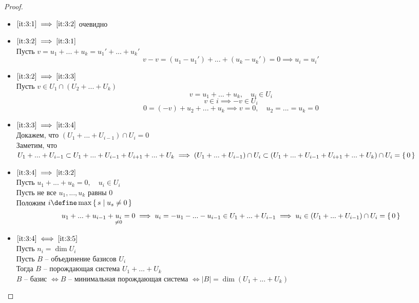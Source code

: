\begin{proof}
    \hfill
    \begin{itemize}
        \item $ \ref{it:3:1} \implies \ref{it:3:2} $ очевидно
        \item $ \ref{it:3:2} \implies \ref{it:3:1} $ \\
        Пусть $ v = u_1 + ... + u_k = u_1' + ... + u_k' $
        $$ v - v = (u_1 - u_1') + ... + (u_k - u_k') = 0 \implies u_i = u_i' $$
        \item $ \ref{it:3:2} \implies \ref{it:3:3} $ \\
        Пусть $v \in U_1 \cap (U_2 + ... + U_k) $
        $$ v = u_1 + ... + u_k, \quad u_i \in U_i $$
        $$ v \in i \implies -v \in U_i $$
        $$ 0 = (-v) + u_2 + ... + u_k \implies v = 0, \quad u_2 = ... = u_k = 0 $$
        \item $ \ref{it:3:3} \implies \ref{it:3:4} $ \\
        Докажем, что $ (U_1 + ... + U_{i - 1}) \cap U_i = 0 $ \\
        Заметим, что $ U_1 + ... + U_{i - 1} \subset U_1 + ... + U_{i - 1} + U_{i + 1} + ... + U_k \implies (U_1 + ... + U_{i - 1}) \cap U_i \subset (U_1 + ... + U_{i - 1} + U_{i + 1} + ... + U_k) \cap U_i = \set{0} $
        \item $ \ref{it:3:4} \implies \ref{it:3:2} $ \\
        Пусть $ u_1 + ... + u_k = 0, \quad u_i \in U_i $ \\
        Пусть не все $ u_1, ..., u_k $ равны 0 \\
        Положим $ i \define \max\set{s | u_s \ne 0} $
        $$ u_1 + ... + u_{i - 1} + \underset{\ne 0}{u_i} = 0 \implies u_i = -u_1 - ... - u_{i - 1} \in U_1 + ... + U_{i - 1} \implies u_i \in (U_1 + ... + U_{i - 1}) \cap U_i = \set{0} $$
        \item $ \ref{it:3:4} \iff \ref{it:3:5} $ \\
        Пусть $n_i = \dim U_i $ \\
        Пусть $B$ -- объединение базисов $U_i$ \\
        Тогда $B$ -- порождающая система $U_1 + ... + U_k $ \\
        $B$ -- базис $ \iff B $ -- минимальная порождающая система $ \iff |B| = \dim (U_1 + ... + U_k) $
    \end{itemize}
\end{proof}
